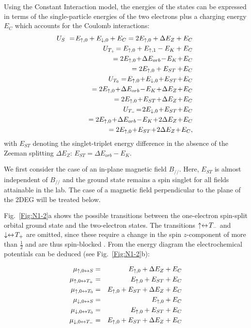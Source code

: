 \documentclass[rmp,twocolumn,aps]{revtex4}
\begin{document}
Using the Constant Interaction model, the energies of the states can be expressed in
terms of the single-particle energies of the two electrons plus a
charging energy $E_{C}$ which accounts for the Coulomb
interactions:
\begin{eqnarray*}
    &&\!\!\!\!\!\!\!\!U_S\ =\! E_{\ua,0}+ E_{\da,0} + E_{C} = 2 E_{\ua,0}+ \Delta E_{Z} + E_{C}\\
    &&\!\!\!\!\!\!\!\!U_{T_+}\!= E_{\ua,0}+ E_{\ua,1} - E_{K} + E_{C} \\
    && = 2 E_{\ua,0}\!+\! \Delta E_{orb}\! -\! E_{K}\! +\! E_{C} \\
    && = 2 E_{\ua,0} + E_{ST} + \!E_{C}\\
    &&\!\!\!\!\!\!\!\!U_{T_0} =\! E_{\ua,0}\! + \! E_{\da,0}\! + \! E_{ST}\!+\!E_{C}\\
    &&=2 E_{\ua,0}\!+\! \Delta E_{orb}\! -\! E_{K}\! +\! \Delta E_{Z}\! +\! E_{C} \\
    && =2 E_{\ua,0}\!+\! E_{ST}\! +\! \Delta E_{Z}\! + \! E_{C}\\
    &&\!\!\!\!\!\!\!\!U_{T_-}\! =\! 2E_{\da,0}\!+\!E_{ST}\!+\!E_{C}\\
    &&=2 E_{\ua,0}\!+\! \Delta E_{orb}\! -\! E_{K}\! +\! 2 \Delta E_{Z}\! +\! E_{C} \\
    &&=2 E_{\ua,0}\!+\!E_{ST}\!+\! 2 \Delta E_{Z} \!+\!E_{C},
\end{eqnarray*}
with $E_{ST}$ denoting the singlet-triplet energy difference in the absence of the Zeeman splitting $\Delta E_{Z}$: $E_{ST}=\Delta E_{orb}-E_{K}$.

We first consider the case of an in-plane magnetic field $B_{//}$.
Here, $E_{ST}$ is almost independent of $B_{//}$ and the ground
state remains a spin singlet for all fields attainable in the lab.
The case of a magnetic field perpendicular to the plane of the
2DEG will be treated below.

Fig.~\ref{Fig:N1-2}a shows the possible transitions between the
one-electron spin-split orbital ground state and the two-electron
states. The transitions $\uparrow\leftrightarrow\!T_-$ and
$\downarrow\leftrightarrow\!T_+$ are omitted, since these require a
change in the spin $z$-component of more than $\frac{1}{2}$ and
are thus spin-blocked \cite{Weinmann}. From the energy diagram the
electrochemical potentials can be deduced (see
Fig.~\ref{Fig:N1-2}b):

\begin{eqnarray*}
    \mu_{\uparrow,0\leftrightarrow S} &=& E_{\uparrow,0} + \Delta E_{Z} + E_{C}\\
    \mu_{\uparrow,0\leftrightarrow T_+} &=& E_{\uparrow,0}+ E_{ST} + E_{C}\\
    \mu_{\uparrow,0\leftrightarrow T_0} &=& E_{\uparrow,0}+ E_{ST} + \Delta E_Z + E_{C}\\
    \mu_{\downarrow,0\leftrightarrow S} &=& E_{\uparrow,0} + E_{C}\\
    \mu_{\downarrow,0\leftrightarrow T_0} &=& E_{\uparrow,0}+ E_{ST} + E_{C}\\
    \mu_{\downarrow,0\leftrightarrow T_-} &=& E_{\uparrow,0}+ E_{ST} + \Delta E_Z + E_{C}
\end{eqnarray*}
\end{document}
